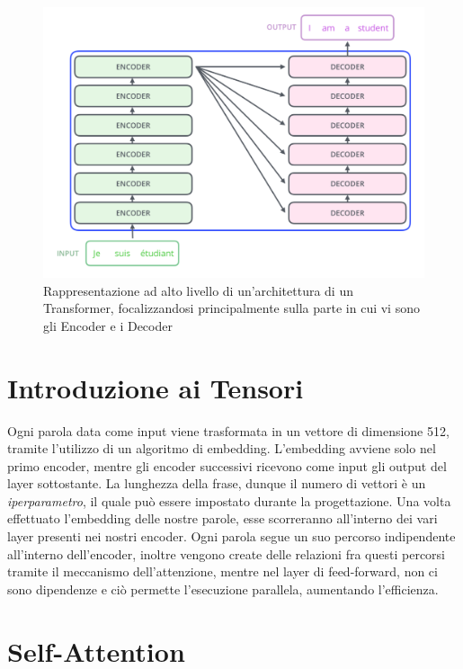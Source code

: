 \begin{figure}
    \centering
    \includegraphics[width=\textwidth]{figure/EncDecTransformers}
    \caption{Rappresentazione ad alto livello di un'architettura di un Transformer, focalizzandosi principalmente sulla parte in cui vi sono gli Encoder e i Decoder}
    \label{fig:EncDecTrasf}
\end{figure}

\section{Introduzione ai Tensori}

Ogni parola data come input viene trasformata in un vettore di dimensione 512, tramite l'utilizzo di un algoritmo di embedding. L'embedding avviene solo nel primo encoder, mentre gli encoder successivi ricevono come input gli output del layer sottostante. La lunghezza della frase, dunque il numero di vettori è un \textit{iperparametro}, il quale può essere impostato durante la progettazione. Una volta effettuato l'embedding delle nostre parole, esse scorreranno all'interno dei vari layer presenti nei nostri encoder. Ogni parola segue un suo percorso indipendente all'interno dell'encoder, inoltre vengono create delle relazioni fra questi percorsi tramite il meccanismo dell'attenzione, mentre nel layer di feed-forward, non ci sono dipendenze e ciò permette l'esecuzione parallela, aumentando l'efficienza.

\section{Self-Attention}

